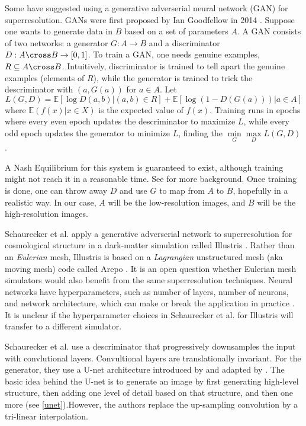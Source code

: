 Some \cite{superresolving-halos,survey} have suggested using a generative adverserial neural network (GAN) for superresolution. GANs were first proposed by Ian Goodfellow in 2014 \cite{GAN}. Suppose one wants to generate data in \(B\) based on a set of parameters \(A\). A GAN consists of two networks: a generator \(G: A \to B\) and a discriminator \(D: A \cross B \to [0, 1]\). To train a GAN, one needs genuine examples, \(R \subseteq A \cross B\). 
Intuitively, discriminator is trained to tell apart the genuine examples (elements of \(R\)), while the generator is trained to trick the descriminator with \((a, G(a))\) for \(a \in A\).
Let \[L(G, D) = \mathbb E [\log D(a, b) | (a, b) \in R] + \mathbb E [\log(1 - D(G(a))) | a \in A]\]
where \(\mathbb E(f(x) | x \in X)\) is the expected value of \(f(x)\).
Training runs in epochs where every even epoch updates the descriminator to maximize \(L\), while every odd epoch updates the generator to minimize \(L\), finding the \(\min\limits_G \max\limits_D L(G, D)\).

A Nash Equilibrium for this system is guaranteed to exist, although training might not reach it in a reasonable time. See \cite{GAN-explainer} for more background.
Once training is done, one can throw away \(D\) and use \(G\) to map from \(A\) to \(B\), hopefully in a realistic way.
In our case, \(A\) will be the low-resolution images, and \(B\) will be the high-resolution images.

Schaurecker et al. \cite{superresolving-halos} apply a generative adverserial network to superresolution for cosmological structure in a dark-matter simulation called Illustris \cite{Illustris}. Rather than an \textit{Eulerian} mesh, Illustris is based on a \textit{Lagrangian} unstructured mesh (aka moving mesh) code called Arepo \cite{Arepo}. It is an open question whether Eulerian mesh simulators would also benefit from the same superresolution techniques. Neural networks have hyperparameters, such as number of layers, number of neurons, and network architecture, which can make or break the application in practice \cite{hyperparameter-importance}. It is unclear if the hyperparameter choices in Schaurecker et al. for Illustris will transfer to a different simulator.

Schaurecker et al. \cite{superresolving-halos} use a descriminator that progressively downsamples the input with convlutional layers. Convultional layers are translationally invariant. For the generator, they use a U-net architecture introduced by \cite{unet} and adapted by \cite{unet-adaptation-1,unet-adaptation-2,unet-adaptation-3}. The basic idea behind the U-net is to generate an image by first generating high-level structure, then adding one level of detail based on that structure, and then one more (see \cref{unet}).However, the authors replace the up-sampling convolution by a tri-linear interpolation.

